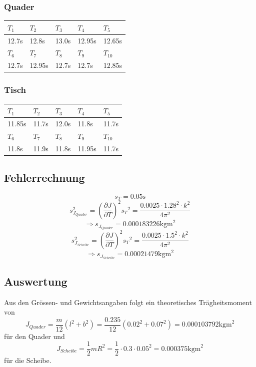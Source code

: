 \documentclass[12pt,a4paper]{article}
\begin{document}
\subsubsection*{Quader}
\begin{tabular}{|l|l|l|l|l|}
\hline
$T_{1}$&$T_{2}$&$T_{3}$&$T_{4}$&$T_{5}$\\
\hline
12.7s&12.8s&13.0s&12.95s&12.65s\\
\hline
\hline
$T_{6}$&$T_{7}$&$T_{8}$&$T_{9}$&$T_{10}$\\
\hline
12.7s&12.95s&12.7s&12.7s&12.85s\\
\hline
\end{tabular}

\subsubsection*{Tisch}
\begin{tabular}{|l|l|l|l|l|}
\hline
$T_{1}$&$T_{2}$&$T_{3}$&$T_{4}$&$T_{5}$\\
\hline
11.85s&11.7s&12.0s&11.8s&11.7s\\
\hline
\hline
$T_{6}$&$T_{7}$&$T_{8}$&$T_{9}$&$T_{10}$\\
\hline
11.8s&11.9s&11.8s&11.95s&11.7s\\
\hline
\end{tabular}

\subsection*{Fehlerrechnung}
\[ s_{T} = 0.05\mbox{s} \]
\[ s_{J_{Quader}}^2 = \left( \frac{\partial J}{\partial T} \right)^2 {s_{T}}^2 = \frac{0.0025 \cdot 1.28^2 \cdot k^2}{4 \pi^2} \]
\[ \Rightarrow s_{J_{Quader}} = 0.000183226 \mbox{kgm}^2 \]
\[ s_{J_{Scheibe}}^2 = \left( \frac{\partial J}{\partial T} \right)^2 {s_{T}}^2 = \frac{0.0025 \cdot 1.5^2 \cdot k^2}{4 \pi^2} \]
\[ \Rightarrow s_{J_{Scheibe}} = 0.00021479 \mbox{kgm}^2 \]

\subsection*{Auswertung}
Aus den Gr\"ossen- und Gewichtsangaben folgt ein theoretisches Tr\"agheitsmoment von
\[ J_{Quader} = \frac{m}{12}(l^2 + b^2) = \frac{0.235}{12}(0.02^2 + 0.07^2) = 0.000103792 \mbox{kgm}^2 \]
f\"ur den Quader und
\[  J_{Scheibe} = \frac{1}{2}mR^2 = \frac{1}{2} \cdot 0.3 \cdot 0.05^2 = 0.000375 \mbox{kgm}^2 \]
f\"ur die Scheibe.
\end{document}
